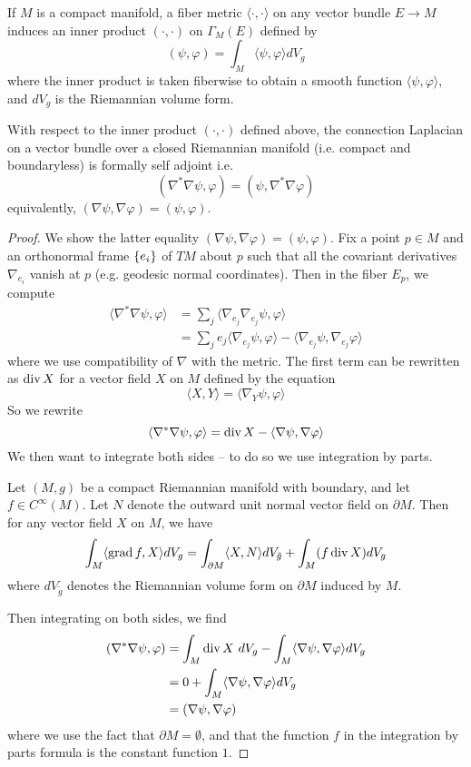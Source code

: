 %
If $M$ is a compact manifold, a fiber metric $\langle\cdot,\cdot\rangle$ on
any vector bundle $E \to M$ induces an inner product $(\cdot,\cdot)$ on
$\Gamma_M(E)$ defined by
\[
(\psi, \varphi) = \int_M \langle \psi, \varphi \rangle dV_g
\]
where the inner product is taken fiberwise to obtain a smooth function
$\langle \psi,\varphi\rangle$, and $dV_g$ is the Riemannian volume form.
%
\begin{prop}
With respect to the inner product $(\cdot,\cdot)$ defined above, the connection
Laplacian on a vector bundle over a closed Riemannian manifold (i.e. compact and
boundaryless) is formally self adjoint i.e.
\[
(\nabla^*\nabla \psi, \varphi) = (\psi, \nabla^*\nabla\varphi)
\]
equivalently, $(\nabla\psi, \nabla\varphi) = (\psi, \varphi)$.
\end{prop}
%
\begin{proof} %
We show the latter equality $(\nabla\psi, \nabla\varphi) = (\psi, \varphi)$. Fix
a point $p \in M$ and an orthonormal frame $\left\lbrace e_i \right\rbrace$ of $TM$ about $p$ such that all
the covariant derivatives $\nabla_{e_i}$ vanish at $p$ (e.g. geodesic normal
coordinates). Then in the fiber $E_p$, we
compute
\begin{align*}
\langle \nabla^*\nabla\psi, \varphi \rangle
&= \sum_j \langle \nabla_{e_j}\nabla_{e_j}\psi, \varphi \rangle \\
&= \sum_j e_j\langle \nabla_{e_j}\psi,\varphi \rangle
- \langle\nabla_{e_j}\psi,\nabla_{e_j}\varphi \rangle
\end{align*}
where we use compatibility of $\nabla$ with the metric. The first term can
be rewritten as $\operatorname{div} X$ for a vector field $X$ on $M$ defined by the equation
\[
\langle X, Y \rangle = \langle \nabla_Y\psi,\varphi \rangle
\]
So we rewrite
\[
\langle \nabla^*\nabla\psi,\varphi\rangle=\operatorname{div} X-\langle\nabla\psi,\nabla\varphi\rangle
\]
We then want to integrate both sides -- to do so we use integration by parts.
\begin{lem}
Let $(M,g)$ be a compact Riemannian manifold with boundary, and let $f \in C^\infty(M)$.
Let $N$ denote the outward unit normal vector field on $\partial M$. Then for any
vector field $X$ on $M$, we have
\[
\int_M \langle \operatorname{grad} f, X\rangle dV_g
= \int_{\partial M} \langle X,N \rangle dV_{\tilde{g}}
+ \int_M (f\operatorname{div} X) dV_g
\]
where $dV_{\tilde{g}}$ denotes the Riemannian volume form on $\partial M$ induced
by $M$.
\end{lem}
Then integrating on both sides, we find
\begin{align*}
(\nabla^*\nabla\psi,\varphi)
&= \int_M \operatorname{div} X ~dV_g - \int_M \langle \nabla\psi,\nabla\varphi \rangle dV_g \\
&= 0 + \int_M \langle \nabla\psi,\nabla\varphi \rangle dV_g \\
&= (\nabla\psi,\nabla\varphi)
\end{align*}
where we use the fact that $\partial M = \emptyset$, and that the function $f$ in
the integration by parts formula is the constant function $1$.
\end{proof}
